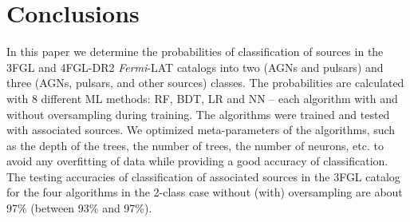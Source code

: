 \documentclass{aa}
\newcommand{\lb}{\label}
\newcommand{\Fermi}{\textit{Fermi}\xspace}
\begin{document}
\begin{table}[!h]
\caption{Expected counts of sources among unassociated 4FGL-DR2 sources.}
\label{tab:expected_counts_prob_4FGL-DR2}

\centering
\end{table}


\section{Conclusions}
\lb{sec:conclusions}

In this paper we determine the probabilities of classification of sources in the 3FGL and 4FGL-DR2 \Fermi-LAT catalogs
into two (AGNs and pulsars) and three (AGNs, pulsars, and other sources) classes.
The probabilities are calculated with 8 different ML methods: RF, BDT, LR and NN -- each algorithm with and without oversampling during training.
The algorithms were trained and tested with associated sources.
We optimized meta-parameters of the algorithms, such as the depth of the trees, the number of trees, the number of neurons, etc. to avoid any overfitting of data while providing a good accuracy of classification.
The testing accuracies of classification of associated sources in the 3FGL catalog for the four algorithms in the 2-class case without (with) oversampling are about  97\% (between 93\% and 97\%).
\end{document}
